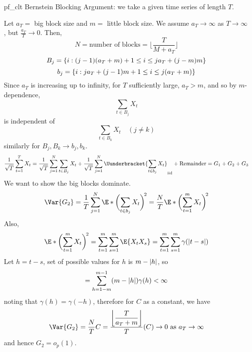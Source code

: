\begin{Proof}{}{pf_clt}
    Bernstein Blocking Argument: we take a given time series of length $ T $.

    Let $ a_T= $ big block size and $ m= $ little block size.
    We assume $ a_T\to\infty $ as $ T\to\infty $, but $ \displaystyle \frac{a_T}{T}\to 0 $.
    Then,
    \[ N=\text{number of blocks}=\biggl\lfloor \frac{T}{M+a_T} \biggr\rfloor \]
    \[ B_j=\{i:(j-1)(a_T+m)+1\le i\le j a_T+(j-m)m\} \]
    \[ b_j=\{i:j a_T+(j-1)m+1\le i\le j(a_T+m)\} \]
    Since $ a_T $ is increasing up to infinity, for $ T $
    sufficiently large, $ a_T>m $, and so
    by $ m $-dependence,
    \[ \sum_{t\in B_j}X_t  \]
    is independent of
    \[ \sum_{t\in B_k}X_t\quad(j\ne k)  \]
    similarly for $ B_j,B_k\to b_j,b_k $.
    \[ \frac{1}{\sqrt{T}}\sum_{t=1}^{T} X_t=\frac{1}{\sqrt{T}}
        \sum_{j=1}^{N}\sum_{t\in B_j}X_t+\frac{1}{\sqrt{T}} \sum_{j=1}^{N}
        \Uunderbracket{\sum_{t\in b_j}X_t}_{\text{iid}}+\text{Remainder}=G_1+G_2+G_3    \]
    We want to show the big blocks dominate.
    \[ \Var{G_2}=\frac{1}{T}
        \sum_{j=1}^{N}\E*{\biggl(\sum_{t\in b_j}X_t \biggr)^{\!2}}=
        \frac{N}{T}\E*{\biggl(\sum_{t=1}^{m} X_t\biggr)^{\!2}} \]
    Also,
    \[ \E*{\biggl(\sum_{t=1}^{m} X_t\biggr)^{\!2}}=\sum_{t=1}^{m} \sum_{s=1}^{m} \E{X_t X_s}=
        \sum_{t=1}^{m} \sum_{s=1}^{m}\gamma(\abs{t-s})  \]
    Let $ h=t-s $, set of possible values for $ h $ is $ m-\lvert h\rvert $, so
    \[ =\sum_{h=1-m}^{m-1} (m-\lvert h\rvert)\gamma(h)<\infty \]
    noting that $ \gamma(h)=\gamma(-h) $, therefore for $ C $ as a constant, we have
    \[ \Var{G_2}=\frac{N}{T}
        C=\frac{\displaystyle \biggl\lfloor \frac{T}{a_T+m} \biggr\rfloor}{T}(C)\to 0\text{ as }a_T\to\infty  \]
    and hence $ G_2=o_p(1) $.


\end{Proof}
